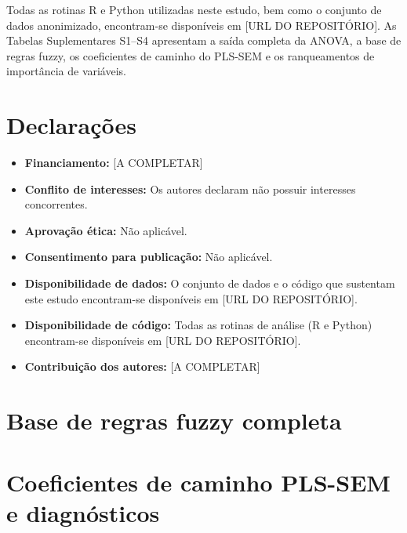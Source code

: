 \documentclass[pdflatex,sn-basic]{sn-jnl}%
\begin{document}
\backmatter


Todas as rotinas R e Python utilizadas neste estudo, bem como o conjunto de dados anonimizado, encontram-se disponíveis em [URL DO REPOSITÓRIO]. As Tabelas Suplementares S1--S4 apresentam a saída completa da ANOVA, a base de regras fuzzy, os coeficientes de caminho do PLS-SEM e os ranqueamentos de importância de variáveis.



\section*{Declarações}

\begin{itemize}
\item \textbf{Financiamento:} [A COMPLETAR]
\item \textbf{Conflito de interesses:} Os autores declaram não possuir interesses concorrentes.
\item \textbf{Aprovação ética:} Não aplicável.
\item \textbf{Consentimento para publicação:} Não aplicável.
\item \textbf{Disponibilidade de dados:} O conjunto de dados e o código que sustentam este estudo encontram-se disponíveis em [URL DO REPOSITÓRIO].
\item \textbf{Disponibilidade de código:} Todas as rotinas de análise (R e Python) encontram-se disponíveis em [URL DO REPOSITÓRIO].
\item \textbf{Contribuição dos autores:} [A COMPLETAR]
\end{itemize}

\begin{appendices}

\section{Base de regras fuzzy completa}\label{secA2}


\section{Coeficientes de caminho PLS-SEM e diagnósticos}\label{secA3}


\end{appendices}

\end{document}
